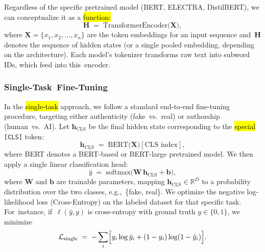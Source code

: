 \documentclass[electronics,article,accept,pdftex,moreauthors,electronics]{Definitions/mdpi}
\begin{document}
Regardless of the specific pretrained model (BERT, ELECTRA, DistilBERT), we can conceptualize it as a \hl{function:} %
\begin{equation}
\label{eq:transformer_encoder}
\mathbf{H} \;=\; \mathrm{TransformerEncoder}\bigl(\mathbf{X}\bigr),
\end{equation}
where $\mathbf{X} = \{x_1, x_2, \dots, x_n\}$ are the token embeddings for an input sequence and~$\mathbf{H}$ denotes the sequence of hidden states (or a single pooled embedding, depending on the architecture). Each model’s tokenizer transforms raw text into subword IDs, which feed into this~encoder.

\subsubsection{Single-Task~Fine-Tuning}

In the {\hl{single-task}} %
 approach, we follow a standard end-to-end fine-tuning procedure, targeting either authenticity (fake~vs.~real) or authorship (human~vs.~AI). Let $\mathbf{h}_\text{CLS}$ be the final hidden state corresponding to the \hl{special} %
 \texttt{[CLS]} token:
\begin{equation}
\mathbf{h}_\text{CLS} \;=\; \mathrm{BERT}\bigl(\mathbf{X}\bigr)[\text{CLS index}],
\end{equation}
where BERT denotes a BERT-based or BERT-large pretrained model. We then apply a single linear classification head:
\begin{equation}
\label{eq:single_task_head}
\hat{y} \;=\; \mathrm{softmax}\bigl(\mathbf{W}\,\mathbf{h}_\text{CLS} + \mathbf{b}\bigr),
\end{equation}
where $\mathbf{W}$ and $\mathbf{b}$ are trainable parameters, mapping $\mathbf{h}_\text{CLS}\!\in\!\mathbb{R}^{D}$ to a probability distribution over the two classes, e.g.,~\{fake, real\}. We optimize the negative log-likelihood loss (Cross-Entropy) on the labeled dataset for that specific task. For~instance, if~$\ell(\hat{y}, y)$ is cross-entropy with ground truth $y\in\{0,1\}$, we minimize
\begin{equation}
\mathcal{L}_\text{single} \;=\; -\sum_{i}\Bigl[y_i \log \hat{y}_i + (1-y_i)\log(1-\hat{y}_i)\Bigr].
\end{equation}
\end{document}
